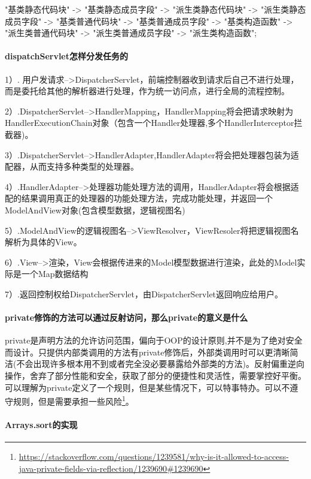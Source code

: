 \documentclass[../../../interview-questions.tex]{subfiles}
\begin{document}
"基类静态代码块" -> "基类静态成员字段" -> "派生类静态代码块"
    -> "派生类静态成员字段" -> "基类普通代码块" -> "基类普通成员字段"
    -> "基类构造函数" -> "派生类普通代码块"
    -> "派生类普通成员字段" -> "派生类构造函数";

\paragraph{dispatchServlet怎样分发任务的}


1）. 用户发请求-->DispatcherServlet，前端控制器收到请求后自己不进行处理，而是委托给其他的解析器进行处理，作为统一访问点，进行全局的流程控制。

2）.DispatcherServlet-->HandlerMapping，HandlerMapping将会把请求映射为HandlerExecutionChain对象（包含一个Handler处理器,多个HandlerInterceptor拦截器)。

3）.DispatcherServlet-->HandlerAdapter,HandlerAdapter将会把处理器包装为适配器，从而支持多种类型的处理器。

4）.HandlerAdapter-->处理器功能处理方法的调用，HandlerAdapter将会根据适配的结果调用真正的处理器的功能处理方法，完成功能处理，并返回一个ModelAndView对象(包含模型数据，逻辑视图名)

5）.ModelAndView的逻辑视图名-->ViewResolver，ViewResoler将把逻辑视图名解析为具体的View。

6）.View-->渲染，View会根据传进来的Model模型数据进行渲染，此处的Model实际是一个Map数据结构

7）.返回控制权给DispatcherServlet，由DispatcherServlet返回响应给用户。



\paragraph{private修饰的方法可以通过反射访问，那么private的意义是什么}

private是声明方法的允许访问范围，偏向于OOP的设计原则,并不是为了绝对安全而设计。只提供内部类调用的方法有private修饰后，外部类调用时可以更清晰简洁(不会出现许多根本用不到或者完全没必要暴露给外部类的方法)。反射偏重逆向操作，舍弃了部分性能和安全，获取了部分的便捷性和灵活性，需要掌控好平衡。可以理解为private定义了一个规则，但是某些情况下，可以特事特办。可以不遵守规则，但是需要承担一些风险\footnote{\url{https://stackoverflow.com/questions/1239581/why-is-it-allowed-to-access-java-private-fields-via-reflection/1239690\#1239690}}。


\paragraph{Arrays.sort的实现}
\end{document}
